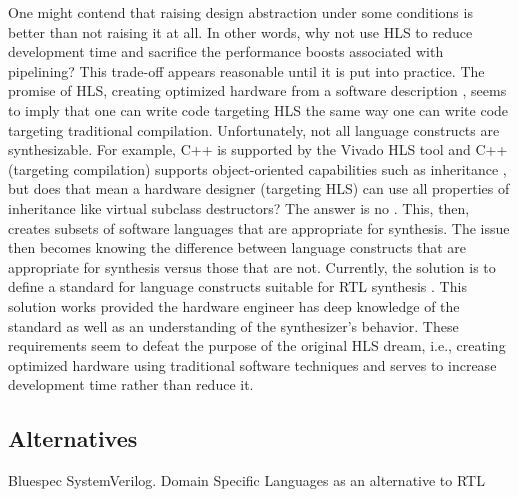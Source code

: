 \documentclass[11pt,journal,compsoc, onecolumn]{IEEEtran}
\begin{document}
One might contend that raising design abstraction under some conditions is better than not raising it at all. In other words, why not use HLS to reduce development time and sacrifice the performance boosts associated with pipelining? This trade-off appears reasonable until it is put into practice. The promise of HLS, creating optimized hardware from a software description \cite{3}, seems to imply that one can write code targeting HLS the same way one can write code targeting traditional compilation. Unfortunately, not all language constructs are synthesizable. For example, C++ is supported by the Vivado HLS tool \cite{vivado} and C++ (targeting compilation) supports object-oriented capabilities such as inheritance \cite{c++datamodel}, but does that mean a hardware designer (targeting HLS) can use all properties of inheritance like virtual subclass destructors? The answer is no \cite{c++hls}. This, then, creates subsets of software languages that are appropriate for synthesis. The issue then becomes knowing the difference between language constructs that are appropriate for synthesis versus those that are not. Currently, the solution is to define a standard for language constructs suitable for RTL synthesis \cite{ieeeverilog}. This solution works provided the hardware engineer has deep knowledge of the standard as well as an understanding of the synthesizer's behavior. These requirements seem to defeat the purpose of the original HLS dream, i.e., creating optimized hardware using traditional software techniques\cite{3} and serves to increase development time rather than reduce it. 

\subsection{Alternatives}
Bluespec SystemVerilog\cite{bsv}. Domain Specific Languages as an alternative to RTL
\end{document}
